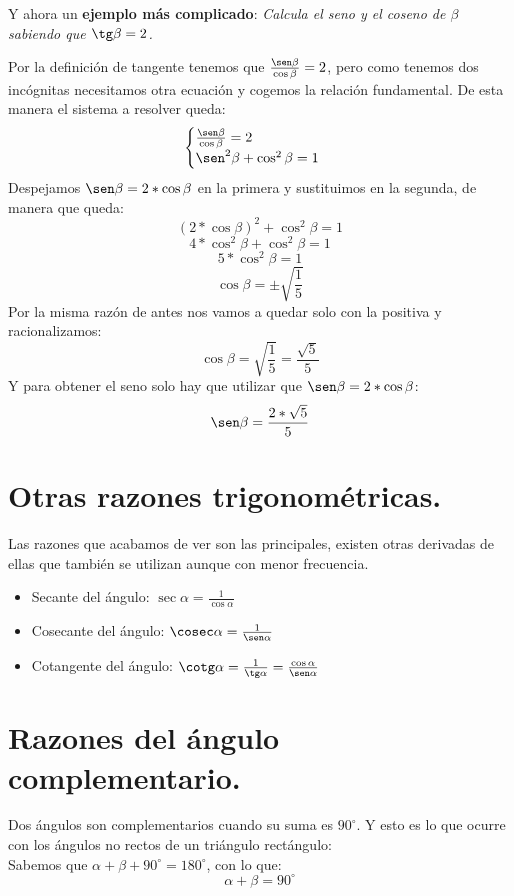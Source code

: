 \documentclass[a4paper,11pt,answers]{exam}
\newcommand{\degree}{^\circ}
\begin{document}
Y ahora un \textbf{ejemplo más complicado}:
\emph{Calcula el seno y el coseno de $\beta$ sabiendo que $\tg \beta = 2$.}
\begin{solution}
  Por la definición de tangente tenemos que $\frac{\sen \beta}{\cos \beta} = 2$, pero como tenemos dos incógnitas necesitamos otra ecuación y cogemos la relación fundamental. De esta manera el sistema a resolver queda:
  \[\begin{cases}
      \frac{\sen \beta}{\cos \beta} = 2\\
      \sen^2 \beta + \cos^2 \beta = 1
    \end{cases}
  \]
  Despejamos $\sen \beta = 2*\cos \beta$ en la primera y sustituimos en la segunda, de manera que queda:
  \[(2*\cos \beta)^2 + \cos^2 \beta = 1\]
  \[4*\cos^2\beta + \cos^2 \beta = 1\]
  \[5*\cos^2 \beta = 1\]
  \[\cos \beta = \pm \sqrt{\frac{1}{5}}\]
  Por la misma razón de antes nos vamos a quedar solo con la positiva y racionalizamos:
  \[\cos \beta = \sqrt{\frac{1}{5}} = \frac{\sqrt{5}}{5}\]
  Y para obtener el seno solo hay que utilizar que $\sen \beta = 2*\cos \beta$:
  \[\sen \beta = \frac{2*\sqrt{5}}{5}\]
\end{solution}


\section{Otras razones trigonométricas.}
Las razones que acabamos de ver son las principales, existen otras derivadas de ellas que también se utilizan aunque con menor frecuencia.
\begin{itemize}
\item Secante del ángulo: $\sec \alpha = \frac{1}{\cos \alpha}$
\item Cosecante del ángulo: $\cosec \alpha = \frac{1}{\sen \alpha}$
\item Cotangente del ángulo: $\cotg \alpha = \frac{1}{\tg \alpha} = \frac{\cos \alpha}{\sen \alpha}$
\end{itemize}
\section{Razones del ángulo complementario.}
Dos ángulos son complementarios cuando su suma es $90\degree$. Y esto es lo que ocurre con los ángulos no rectos de un triángulo rectángulo:\\
Sabemos que $\alpha + \beta + 90\degree = 180\degree$, con lo que:
\[\alpha + \beta = 90\degree\]
\end{document}
